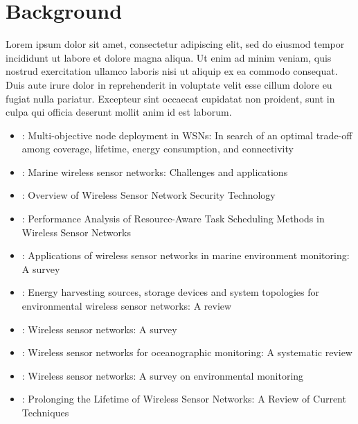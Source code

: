 \section{Background}
\label{section:background}
Lorem ipsum dolor sit amet, consectetur adipiscing elit, sed do eiusmod tempor incididunt ut labore et dolore magna aliqua. Ut enim ad minim veniam, quis nostrud exercitation ullamco laboris nisi ut aliquip ex ea commodo consequat. Duis aute irure dolor in reprehenderit in voluptate velit esse cillum dolore eu fugiat nulla pariatur. Excepteur sint occaecat cupidatat non proident, sunt in culpa qui officia deserunt mollit anim id est laborum.

\begin{itemize}
	\item \cite{Sengupta2013}: Multi-objective node deployment in WSNs: In search of an optimal trade-off among coverage, lifetime, energy consumption, and connectivity 
	
	\item \cite{Mahdy2008}: Marine wireless sensor networks: Challenges and applications
	
	\item \cite{Islam12}: Overview of Wireless Sensor Network Security Technology
	
	\item  \cite{doi:10.1155/2014/765182}: Performance Analysis of Resource-Aware Task Scheduling Methods in Wireless Sensor Networks
	
	\item\cite{Xu2014f}: Applications of wireless sensor networks in marine environment monitoring: A survey
	
	\item \cite{Prauzek2018}: Energy harvesting sources, storage devices and system topologies for environmental wireless sensor networks: A review
	
	\item \cite{Akyildiz}: Wireless sensor networks: A survey
	
	\item \cite{Albaladejo2010}: Wireless sensor networks for oceanographic monitoring: A systematic review
	
	\item \cite{Oliveira2011}: Wireless sensor networks: A survey on environmental monitoring
	
	\item \cite{10.1155/2018/8035065}: Prolonging the Lifetime of Wireless Sensor Networks: A Review of Current Techniques
	
\end{itemize}
